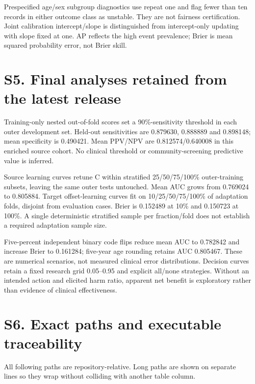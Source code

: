 \documentclass[10pt]{article}
\let\originalsection\section
\renewcommand\section{\Needspace{6\baselineskip}\originalsection}
\begin{document}
Prespecified age/sex subgroup diagnostics use repeat one and flag fewer than ten records in either outcome class as unstable. They are not fairness certification. Joint calibration intercept/slope is distinguished from intercept-only updating with slope fixed at one. AP reflects the high event prevalence; Brier is mean squared probability error, not Brier skill.

\section*{S5. Final analyses retained from the latest release}
Training-only nested out-of-fold scores set a 90\%-sensitivity threshold in each outer development set. Held-out sensitivities are 0.879630, 0.888889 and 0.898148; mean specificity is 0.490421. Mean PPV/NPV are 0.812574/0.640008 in this enriched source cohort. No clinical threshold or community-screening predictive value is inferred.

Source learning curves retune C within stratified 25/50/75/100\% outer-training subsets, leaving the same outer tests untouched. Mean AUC grows from 0.769024 to 0.805884. Target offset-learning curves fit on 10/25/50/75/100\% of adaptation folds, disjoint from evaluation cases. Brier is 0.152489 at 10\% and 0.150723 at 100\%. A single deterministic stratified sample per fraction/fold does not establish a required adaptation sample size.

Five-percent independent binary code flips reduce mean AUC to 0.782842 and increase Brier to 0.161284; five-year age rounding retains AUC 0.805467. These are numerical scenarios, not measured clinical error distributions. Decision curves retain a fixed research grid 0.05--0.95 and explicit all/none strategies. Without an intended action and elicited harm ratio, apparent net benefit is exploratory rather than evidence of clinical effectiveness.

\section*{S6. Exact paths and executable traceability}
All following paths are repository-relative. Long paths are shown on separate lines so they wrap without colliding with another table column.
\end{document}
